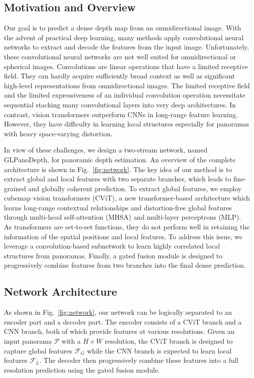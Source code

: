 \documentclass[10pt,twocolumn,letterpaper]{article}
\begin{document}
\subsection{Motivation and Overview}
Our goal is to predict a dense depth map from an omnidirectional image. With the advent of practical deep learning, many methods apply convolutional neural networks to extract and decode the features from the input image.
Unfortunately, these convolutional neural networks are not well suited for omnidirectional or spherical images. 
Convolutions are linear operations that have a limited receptive field. They can hardly acquire sufficiently broad context as well as significant high-level representations from omnidirectional images. The limited receptive field and the limited expressiveness of an individual convolution operation necessitate sequential stacking many convolutional layers into very deep architectures. 
In contrast, vision transformers \cite{vit} outperform CNNs in long-range feature learning. However, they have difficulty in learning local structures especially for panoramas with heavy space-varying distortion.

In view of these challenges, we design a two-stream network, named GLPanoDepth, for panoramic depth estimation. An overview of the complete architecture is shown in Fig.~\ref{fig:network}. The key idea of our method is to extract global and local features with two separate branches, which leads to fine-grained and globally coherent prediction. To extract global features, we employ cubemap vision transformers (CViT), a new transformer-based architecture which learns long-range contextual relationships and distortion-free global features through multi-head self-attention (MHSA) \cite{NIPS2017_3f5ee243} and multi-layer perceptrons (MLP). As transformers are set-to-set functions, they do not perform well in retaining the information of the spatial positions and local features. To address this issue, we leverage a convolution-based subnetwork to learn highly correlated local structures from panoramas. Finally, a gated fusion module is designed to progressively combine features from two branches into the final dense prediction. 

\subsection{Network Architecture}
As shown in Fig.~\ref{fig:network}, our network can be logically separated to an encoder part and a decoder part. The encoder consists of a CViT branch and a CNN branch, both of which provide features at various resolutions. Given an input panorama $\mathcal{P}$ with a $H\times W$ resolution, the CViT branch is designed to capture global features $\mathcal{F}_{G}$ while the CNN branch is expected to learn local features $\mathcal{F}_{L}$. The decoder then progressively combine these features into a full resolution prediction using the gated fusion module. 
\end{document}
